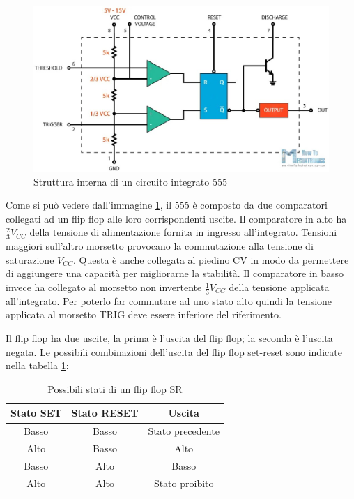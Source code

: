 \begin{figure}[h!]
	\centering
	\includegraphics[width=\linewidth]{./ImageFiles/Laboratorio 4/555internals.jpg}
	\caption{Struttura interna di un circuito integrato 555}
	\label{fig:555_internals}
\end{figure}

\noindent
Come si può vedere dall'immagine \ref{fig:555_internals}, il 555 è composto da due comparatori collegati ad un flip flop alle loro corrispondenti uscite. Il comparatore in alto ha $\frac{2}{3}V_{CC}$ della tensione di alimentazione fornita in ingresso all'integrato. Tensioni maggiori sull'altro morsetto provocano la commutazione alla tensione di saturazione $V_{CC}$. Questa è anche collegata al piedino CV in modo da permettere di aggiungere una capacità per migliorarne la stabilità. Il comparatore in basso invece ha collegato al morsetto non invertente $\frac{1}{3}V_{CC}$ della tensione applicata all'integrato. Per poterlo far commutare ad uno stato alto quindi la tensione applicata al morsetto TRIG deve essere inferiore del riferimento.

Il flip flop ha due uscite, la prima è l'uscita del flip flop; la seconda è l'uscita negata.
Le possibili combinazioni dell'uscita del flip flop set-reset sono indicate nella tabella \ref{tab:flip_flop_states}:

\def\arraystretch{1.3}
\begin{table}[h!]
	\centering
	\begin{tabular}{|c|c|c|}
		\hline
		Stato SET	& Stato RESET & Uscita \\ \hline
		Basso & Basso & Stato precedente  \\ \hline
		Alto & Basso & Alto\\ \hline
		Basso & Alto & Basso\\ \hline
		Alto & Alto & Stato proibito \\ \hline
	\end{tabular}
	\caption{Possibili stati di un flip flop SR}
	\label{tab:flip_flop_states}
\end{table}

